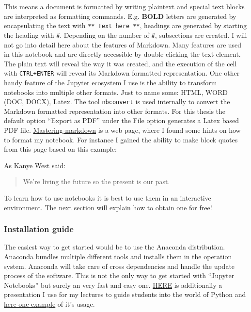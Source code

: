\documentclass[11pt]{article}
\begin{document}
This means a document is formatted by writing plaintext and special text
blocks are interpreted as formatting commands. E.g. \textbf{BOLD}
letters are generated by encapsulating the text with
\texttt{**\ Text\ here\ **}, headings are generated by starting the
heading with \texttt{\#}. Depending on the number of \texttt{\#},
subsections are created. I will not go into detail here about the
features of Markdown. Many features are used in this notebook and are
directly accessible by double-clicking the text element. The plain text
will reveal the way it was created, and the execution of the cell with
\texttt{CTRL+ENTER} will reveal its Markdown formatted representation.
One other handy feature of the Jupyter ecosystem I use is the ability to
transform notebooks into multiple other formats. Just to name some:
HTML, WORD (DOC, DOCX), Latex. The tool \texttt{nbconvert} is used
internally to convert the Markdown formatted representation into other
formats. For this thesis the default option ``Export as PDF'' under the
File option generates a Latex based PDF file.
\href{https://guides.github.com/features/mastering-markdown/}{Mastering-markdown}
is a web page, where I found some hints on how to format my notebook.
For instance I gained the ability to make block quotes from this page
based on this example:

As Kanye West said:

\begin{quote}
We're living the future so the present is our past.
\end{quote}

To learn how to use notebooks it is best to use them in an interactive
environment. The next section will explain how to obtain one for free!

    \hypertarget{installation-guide}{%
\subsubsection{Installation guide}\label{installation-guide}}

The easiest way to get started would be to use the Anaconda
distribution. Anaconda bundles multiple different tools and installs
them in the operation system. Anaconda will take care of cross
dependencies and handle the update process of the software. This is not
the only way to get started with ``Jupyter Notebooks'' but surely an
very fast and easy one.
\href{media/presentations/InstallAnaconda/Anaconda-Python.pdf}{HERE} is
additionally a presentation I use for my lectures to guide students into
the world of Python and
\href{media/presentations/InstallAnaconda/PythonÜbung.zip}{here one
example} of it's usage.
\end{document}
